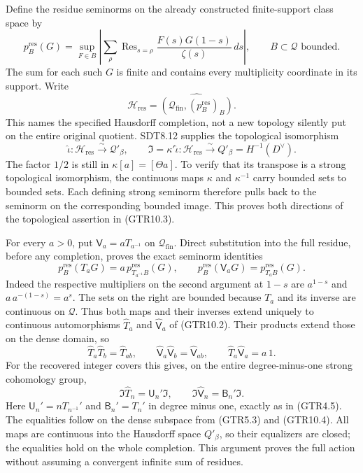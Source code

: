 Define the residue seminorms on the already constructed finite-support
class space by \[
p_B^{\mathrm{res}}(G)=\sup_{F\in B}\left|
\sum_\rho\operatorname{Res}_{s=\rho}
\frac{F(s)G(1-s)}{\zeta(s)}\,ds\right|,
\qquad B\subset\mathcal Q\text{ bounded}.
\tag{GTR10.1}
\] The sum for each such \(G\) is finite and contains every multiplicity
coordinate in its support. Write \[
\mathcal H_{\mathrm{res}}
=\widehat{(\mathcal Q_{\mathrm{fin}},(p_B^{\mathrm{res}})_B)}.
\tag{GTR10.2}
\] This names the specified Hausdorff completion, not a new topology
silently put on the entire original quotient. SDT8.12 supplies the
topological isomorphism \[
\widehat\iota:\mathcal H_{\mathrm{res}}\xrightarrow{\sim}\mathcal Q'_\beta,
\qquad
\mathfrak I=\kappa'\widehat\iota:
\mathcal H_{\mathrm{res}}\xrightarrow{\sim}Q'_\beta
=H^{-1}(D^\vee).
\tag{GTR10.3}
\] The factor \(1/2\) is still in \(\kappa[a]=[\Theta a]\). To verify
that its transpose is a strong topological isomorphism, the continuous
maps \(\kappa\) and \(\kappa^{-1}\) carry bounded sets to bounded sets.
Each defining strong seminorm therefore pulls back to the seminorm on
the corresponding bounded image. This proves both directions of the
topological assertion in (GTR10.3).

For every \(a>0\), put \(\mathsf V_a=aT_{a^{-1}}\) on
\(\mathcal Q_{\mathrm{fin}}\). Direct substitution into the full
residue, before any completion, proves the exact seminorm identities \[
p_B^{\mathrm{res}}(T_aG)
=a\,p_{T_{a^{-1}}B}^{\mathrm{res}}(G),\qquad
p_B^{\mathrm{res}}(\mathsf V_aG)
=p_{T_aB}^{\mathrm{res}}(G).
\tag{GTR10.4}
\] Indeed the respective multipliers on the second argument at \(1-s\)
are \(a^{1-s}\) and \(a\,a^{-(1-s)}=a^s\). The sets on the right are
bounded because \(T_a\) and its inverse are continuous on
\(\mathcal Q\). Thus both maps and their inverses extend uniquely to
continuous automorphisms \(\widehat T_a\) and \(\widehat{\mathsf V}_a\)
of (GTR10.2). Their products extend those on the dense domain, so \[
\widehat T_a\widehat T_b=\widehat T_{ab},\qquad
\widehat{\mathsf V}_a\widehat{\mathsf V}_b
=\widehat{\mathsf V}_{ab},\qquad
\widehat T_a\widehat{\mathsf V}_a=a\,1.
\tag{GTR10.5}
\] For the recovered integer covers this gives, on the entire
degree-minus-one strong cohomology group, \[
\boxed{
\mathfrak I\widehat T_n=\mathsf U_n'\mathfrak I,
\qquad
\mathfrak I\widehat{\mathsf V}_n=\mathsf B_n'\mathfrak I.}
\tag{GTR10.6}
\] Here \(\mathsf U_n'=nT_{n^{-1}}'\) and \(\mathsf B_n'=T_n'\) in
degree minus one, exactly as in (GTR4.5). The equalities follow on the
dense subspace from (GTR5.3) and (GTR10.4). All maps are continuous into
the Hausdorff space \(Q'_\beta\), so their equalizers are closed; the
equalities hold on the whole completion. This argument proves the full
action without assuming a convergent infinite sum of residues.

